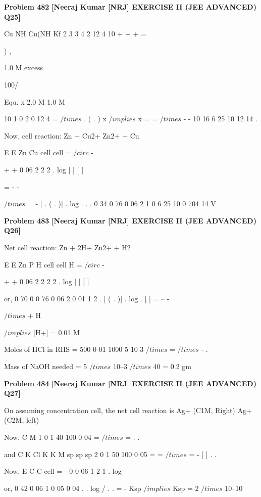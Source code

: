 \begin{problembox}
\textbf{Problem 482} \hfill \textbf{[Neeraj Kumar [NRJ] EXERCISE II (JEE ADVANCED) Q25]}
\label{q:ext-nrj_all_questions-482}

Cu
NH
Cu(NH
Kf
2
3
3 4
2
12
4
10
+
+
+
=

  


 



)
,
 
             1.0 M   excess
 
 100/%
 
 Equ.          x      2.0 M            1.0 M
 
 
10
1 0
2 0
12
4
=
$/times$
.
( . )
x
 $/implies$ x =
=
$/times$
-
-
10
16
6 25 10
12
14
.
 
 Now, cell reaction: Zn + Cu2+   Zn2+ + Cu
 
 
E
E
Zn
Cu
cell
cell
=
$/circ$
-
 
+
+
0 06
2
2
2
.
log [
]
[
]
 
 
=
-
-
 
$/times$
=
-
[ .
( .
)]
.
log
.
.
.
0 34
0 76
0 06
2
1 0
6 25 10
0 704
14
V
\end{problembox}

\begin{problembox}
\textbf{Problem 483} \hfill \textbf{[Neeraj Kumar [NRJ] EXERCISE II (JEE ADVANCED) Q26]}
\label{q:ext-nrj_all_questions-483}

Net cell reaction: Zn + 2H+   Zn2+ + H2
 
 
E
E
Zn
P
H
cell
cell
H
=
$/circ$
-
 
+
+
0 06
2
2
2
2
.
log
[
]
[
]
 
 or, 0 70
0
0 76
0 06
2
0 01 1
2
.
[
(
.
)]
.
log .
[
]
=
--
-
 
$/times$
+
H
 
 
 $/implies$ [H+] = 0.01 M
 
 Moles of HCl in RHS = 500
0 01
1000
5 10 3
$/times$
=
$/times$
-
.
 
   Mass of NaOH needed = 5 $/times$ 10--3 $/times$ 40 = 0.2 gm
\end{problembox}

\begin{problembox}
\textbf{Problem 484} \hfill \textbf{[Neeraj Kumar [NRJ] EXERCISE II (JEE ADVANCED) Q27]}
\label{q:ext-nrj_all_questions-484}

On assuming concentration cell, the net cell 
reaction is Ag+ (C1M, Right) 
  Ag+ (C2M, 
left)
 
 Now, C
M
1
0 1
40
100
0 04
=
$/times$
=
.
.
 
 and C
K
Cl
K
K
M
sp
sp
sp
2
0 1
50
100
0 05
=
=
$/times$
=
-
[
]
.
.
 
 Now, E
C
C
cell =
-
0
0 06
1
2
1
.
log
 
 or, 0 42
0 06
1
0 05
0 04
.
.
log
/ .
.
= -
Ksp
 $/implies$ Ksp = 2 $/times$ 10--10
\end{problembox}

